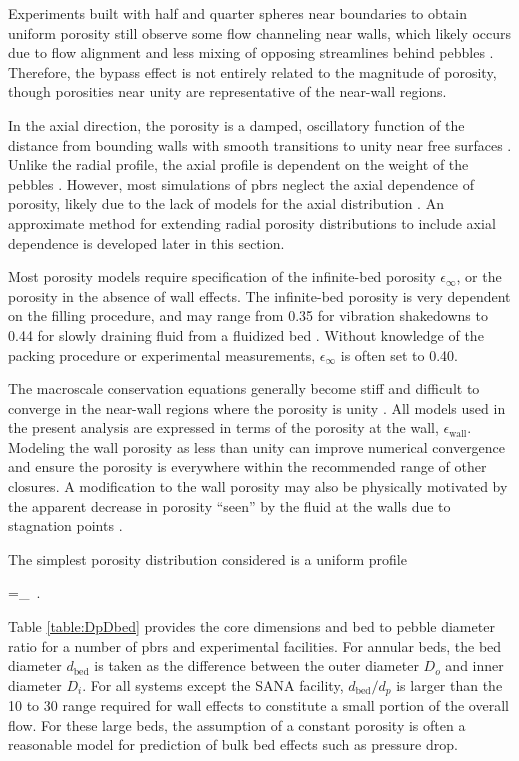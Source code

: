 Experiments built with half and quarter spheres near boundaries to obtain uniform porosity still observe some flow channeling near walls, which likely occurs due to flow alignment and less mixing of opposing streamlines behind pebbles \cite{mickley}. Therefore, the bypass effect is not entirely related to the magnitude of porosity, though porosities near unity are representative of the near-wall regions.

In the axial direction, the porosity is a damped, oscillatory function of the distance from bounding walls with smooth transitions to unity near free surfaces \cite{auwerda2013,duToit2008,y_li,sun,abdalla}. Unlike the radial profile, the axial profile is dependent on the weight of the pebbles \cite{duToit2008}. However, most simulations of \glspl{pbr} neglect the axial dependence of porosity, likely due to the lack of models for the axial distribution \cite{becker, becker2003, duToit2006, lim, nouri, tecdoc1163, baggemann, ge}. An approximate method for extending radial porosity distributions to include axial dependence is developed later in this section.

Most porosity models require specification of the infinite-bed porosity \(\epsilon_\infty\), or the porosity in the absence of wall effects. The infinite-bed porosity is very dependent on the filling procedure, and may range from 0.35 for vibration shakedowns to 0.44 for slowly draining fluid from a fluidized bed \cite{klerk}. Without knowledge of the packing procedure or experimental measurements, \(\epsilon_\infty\) is often set to 0.40. 

The macroscale conservation equations generally become stiff and difficult to converge in the near-wall regions where the porosity is unity \cite{vortmeyer}. All models used in the present analysis are expressed in terms of the porosity at the wall, \(\epsilon_\text{wall}\). Modeling the wall porosity as less than unity can improve numerical convergence and ensure the porosity is everywhere within the recommended range of other closures. A modification to the wall porosity may also be physically motivated by the apparent decrease in porosity ``seen'' by the fluid at the walls due to stagnation points \cite{abdulmohsin,giese,becker2003}.

The simplest porosity distribution considered is a uniform profile

\beq
\label{eq:ConstantEps}
\epsilon=\epsilon_\infty\ .
\eeq

\noindent Table \ref{table:DpDbed} provides the core dimensions and bed to pebble diameter ratio for a number of \glspl{pbr} and experimental facilities. For annular beds, the bed diameter \(d_\text{bed}\) is taken as the difference between the outer diameter \(D_o\) and inner diameter \(D_i\). For all systems except the SANA facility, \(d_\text{bed}/d_p\) is larger than the 10 to 30 range required for wall effects to constitute a small portion of the overall flow. For these large beds, the assumption of a constant porosity is often a reasonable model for prediction of bulk bed effects such as pressure drop.

